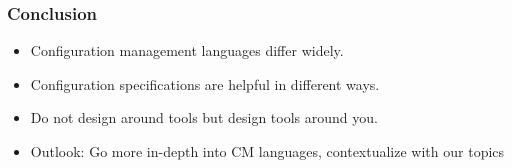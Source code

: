 \begin{frame}
	\frametitle{Conclusion}

	\begin{itemize}[<+-| alert@+>]
	\item Configuration management languages differ widely.
	\item Configuration specifications are helpful in different ways.
	\item Do not design around tools but design tools around you.
	\item Outlook: Go more in-depth into CM languages, contextualize with our topics
	\end{itemize}
\end{frame}



\nocite{raab2017introducing}

\appendix

\begin{frame}[allowframebreaks]
	
	
\end{frame}




